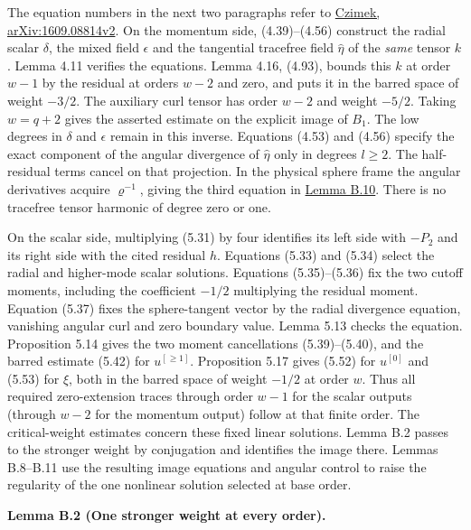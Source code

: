 \documentclass[
  english,
  11pt,
  reqno]{amsart}
\makeatletter
\newcommand{\pandocstatementheading}[1]{%
  \par\addpenalty{\@beginparpenalty}%
  \addvspace{.5\baselineskip plus .2\baselineskip minus .2\baselineskip}%
  {\normalfont\bfseries #1\par}%
  \nobreak\@afterindenttrue\@afterheading
}
\makeatother
\begin{document}
The equation numbers in the next two paragraphs refer to
\href{https://arxiv.org/pdf/1609.08814v2}{Czimek, arXiv:1609.08814v2}.
On the momentum side, (4.39)--(4.56) construct the radial scalar
\(\delta\), the mixed field \(\epsilon\) and the tangential tracefree
field \(\widehat\eta\) of the \emph{same} tensor \(k\). Lemma 4.11
verifies the equations. Lemma 4.16, (4.93), bounds this \(k\) at order
\(w-1\) by the residual at orders \(w-2\) and zero, and puts it in the
barred space of weight \(-3/2\). The auxiliary curl tensor has order
\(w-2\) and weight \(-5/2\). Taking \(w=q+2\) gives the asserted
estimate on the explicit image of \(B_1\). The low degrees in \(\delta\)
and \(\epsilon\) remain in this inverse. Equations (4.53) and (4.56)
specify the exact component of the angular divergence of
\(\widehat\eta\) only in degrees \(l\ge2\). The half-residual terms
cancel on that projection. In the physical sphere frame the angular
derivatives acquire \(\varrho^{-1}\), giving the third equation in
\hyperref[eq:online-momentum-radial-divergence]{Lemma B.10}. There is no
tracefree tensor harmonic of degree zero or one.

On the scalar side, multiplying (5.31) by four identifies its left side
with \(-P_2\) and its right side with the cited residual \(h\).
Equations (5.33) and (5.34) select the radial and higher-mode scalar
solutions. Equations (5.35)--(5.36) fix the two cutoff moments,
including the coefficient \(-1/2\) multiplying the residual moment.
Equation (5.37) fixes the sphere-tangent vector by the radial divergence
equation, vanishing angular curl and zero boundary value. Lemma 5.13
checks the equation. Proposition 5.14 gives the two moment cancellations
(5.39)--(5.40), and the barred estimate (5.42) for \(u^{[\ge1]}\).
Proposition 5.17 gives (5.52) for \(u^{[0]}\) and (5.53) for \(\xi\),
both in the barred space of weight \(-1/2\) at order \(w\). Thus all
required zero-extension traces through order \(w-1\) for the scalar
outputs (through \(w-2\) for the momentum output) follow at that finite
order. The critical-weight estimates concern these fixed linear
solutions. Lemma B.2 passes to the stronger weight by conjugation and
identifies the image there. Lemmas B.8--B.11 use the resulting image
equations and angular control to raise the regularity of the one
nonlinear solution selected at base order.

\pandocstatementheading{\leavevmode{}\label{lem:online-extension-stronger-weight-inverse}Lemma B.2 (One stronger weight at every order).}
\end{document}
